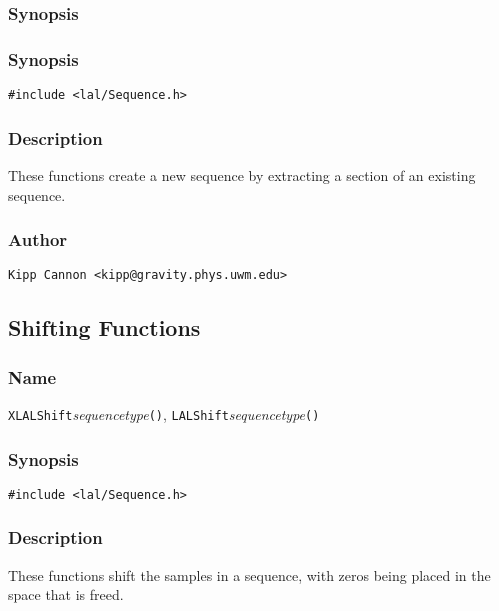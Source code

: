 \subsubsection{Synopsis}

\subsubsection{Synopsis}

\begin{verbatim}
#include <lal/Sequence.h>
\end{verbatim}


\subsubsection{Description}

These functions create a new sequence by extracting a section of an
existing sequence.

\subsubsection{Author}

\verb|Kipp Cannon <kipp@gravity.phys.uwm.edu>|


\subsection{Shifting Functions}

\subsubsection{Name}

\texttt{XLALShift}\textit{sequencetype}\texttt{()},
\texttt{LALShift}\textit{sequencetype}\texttt{()}

\subsubsection{Synopsis}

\begin{verbatim}
#include <lal/Sequence.h>
\end{verbatim}


\subsubsection{Description}

These functions shift the samples in a sequence, with zeros being placed in
the space that is freed.

